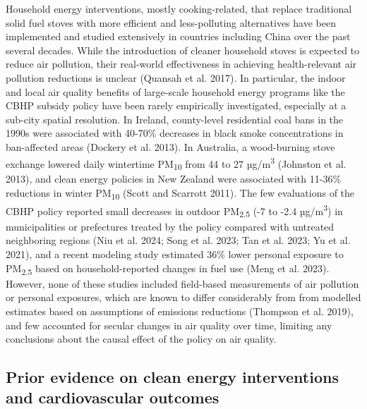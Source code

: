 \documentclass[
  letterpaper,
  DIV=11,
  numbers=noendperiod]{scrartcl}
\begin{document}
Household energy interventions, mostly cooking-related, that replace
traditional solid fuel stoves with more efficient and less-polluting
alternatives have been implemented and studied extensively in countries
including China over the past several decades. While the introduction of
cleaner household stoves is expected to reduce air pollution, their
real-world effectiveness in achieving health-relevant air pollution
reductions is unclear (Quansah et al. 2017). In particular, the indoor
and local air quality benefits of large-scale household energy programs
like the CBHP subsidy policy have been rarely empirically investigated,
especially at a sub-city spatial resolution. In Ireland, county-level
residential coal bans in the 1990s were associated with 40-70\%
decreases in black smoke concentrations in ban-affected areas (Dockery
et al. 2013). In Australia, a wood-burning stove exchange lowered daily
wintertime PM\textsubscript{10} from 44 to 27 µg/m\textsuperscript{3}
(Johnston et al. 2013), and clean energy policies in New Zealand were
associated with 11-36\% reductions in winter PM\textsubscript{10} (Scott
and Scarrott 2011). The few evaluations of the CBHP policy reported
small decreases in outdoor PM\textsubscript{2.5} (-7 to -2.4
µg/m\textsuperscript{3}) in municipalities or prefectures treated by the
policy compared with untreated neighboring regions (Niu et al. 2024;
Song et al. 2023; Tan et al. 2023; Yu et al. 2021), and a recent
modeling study estimated 36\% lower personal exposure to
PM\textsubscript{2.5} based on household-reported changes in fuel use
(Meng et al. 2023). However, none of these studies included field-based
measurements of air pollution or personal exposures, which are known to
differ considerably from from modelled estimates based on assumptions of
emissions reductions (Thompson et al. 2019), and few accounted for
secular changes in air quality over time, limiting any conclusions about
the causal effect of the policy on air quality.

\hypertarget{prior-evidence-on-clean-energy-interventions-and-cardiovascular-outcomes}{%
\subsection{Prior evidence on clean energy interventions and
cardiovascular
outcomes}\label{prior-evidence-on-clean-energy-interventions-and-cardiovascular-outcomes}}
\end{document}
